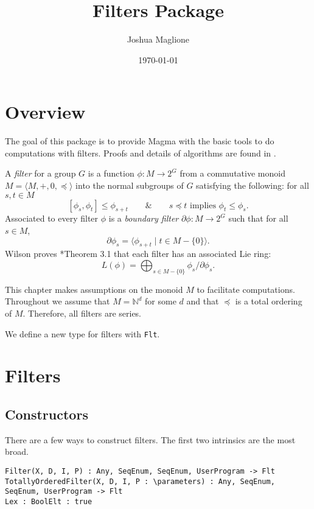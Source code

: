 \documentclass{amsart}
\title{Filters Package}
\author{Joshua Maglione}
\date{\today}
\begin{document}
\maketitle
\tableofcontents

\section{Overview}

The goal of this package is to provide {\sc Magma} \cite{Magma} with the basic tools to do computations with filters.
Proofs and details of algorithms are found in \cites{M:Filters,M:Classical,W:Char,W:Filters}.

A \emph{filter} for a group $G$ is a function $\phi : M\rightarrow 2^G$ from a commutative monoid $M=\langle M,+,0,\preceq\rangle$ into the normal subgroups of $G$ satisfying the following: for all $s,t\in M$
\[ [\phi_s,\phi_t]\leq \phi_{s+t} \qquad\&\qquad s\preceq t \text{ implies } \phi_t\leq \phi_s.\]
Associated to every filter $\phi$ is a \emph{boundary filter} $\partial\phi:M\rightarrow 2^G$ such that for all $s\in M$,
\[ \partial\phi_s = \langle \phi_{s+t} \mid t\in M-\{0\}\rangle. \]
Wilson proves \cite{W:Char}*{Theorem 3.1} that each filter has an associated Lie ring:
\begin{equation*}\label{eqn:Lie-ring} 
L(\phi) = \bigoplus_{s\in M-\{0\}} \phi_s/\partial\phi_s.
\end{equation*}

This chapter makes assumptions on the monoid $M$ to facilitate computations. 
Throughout we assume that $M=\mathbb{N}^d$ for some $d$ and that $\preceq$ is a total ordering of $M$. 
Therefore, all filters are series.

We define a new type for filters with {\tt Flt}.


\section{Filters}


\subsection{Constructors}
There are a few ways to construct filters. The first two intrinsics are the most broad.

\color{blue}
{\small 
\begin{verbatim}
Filter(X, D, I, P) : Any, SeqEnum, SeqEnum, UserProgram -> Flt
TotallyOrderedFilter(X, D, I, P : \parameters) : Any, SeqEnum, SeqEnum, UserProgram -> Flt
Lex : BoolElt : true
\end{verbatim}
}
\color{black}
\end{document}
